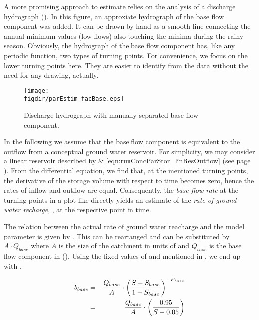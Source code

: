 A more promising approach to estimate \facBase{} relies on the analysis of a discharge hydrograph (). In this figure, an approxiate hydrograph of the base flow component was added. It can be drawn by hand as a smooth line connecting the annual minimum values (low flows) also touching the minima during the rainy season. Obviously, the hydrograph of the base flow component has, like any periodic function, two types of turning points. For convenience, we focus on the lower turning points here. They are easier to identify from the data without the need for any drawing, actually.

\begin{figure}
  \texttt{[image: \\figdir/parEstim\_facBase.eps]}
  \caption{Discharge hydrograph with manually separated base flow component. \label{fig:runGen4comp_parEstim_facBase}}
\end{figure}

In the following we assume that the base flow component is equivalent to the outflow from a conceptual ground water reservoir. For simplicity, we may consider a linear reservoir described by  \& \ref{eqn:runConcParStor_linResOutflow} (see page \pageref{eqn:runConcParStor_linResBalance}). From the differential equation, we find that, at the mentioned turning points, the derivative of the storage volume with respect to time becomes zero, hence the rates of inflow and outflow are equal. Consequently, the \emph{base flow rate} at the turning points in a plot like  directly yields an estimate of the \emph{rate of ground water recharge}, \rateRunoffBase{}, at the respective point in time.

The relation between the actual rate of ground water reacharge \rateRunoffBase{} and the model parameter \facBase{} is given by . This can be rearranged and \rateRunoffBase{} can be substituted by $A \cdot Q_{base}$ where $A$ is the size of the catchment in units of \sqm{} and $Q_{base}$ is the base flow component in \cbms{} (). Using the fixed values of \relSatBase{} and \expBase{} mentioned in  , we end up with .

\begin{eqnarray}
  {b_{base}} &=& \dfrac{Q_{base}}{A} \cdot \left( \dfrac{S-S_{base}}{1 - S_{base}} \right) ^ {-{E_{base}}} \label{eqn:runGen4comp_parEstim_facBase} \\
           &=& \dfrac{Q_{base}}{A} \cdot \left( \dfrac{0.95}{S - 0.05} \right) \label{eqn:runGen4comp_parEstim_facBase_final}
\end{eqnarray}

